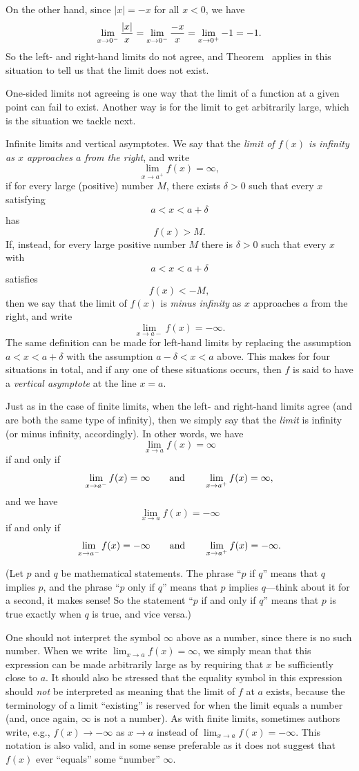 On the other hand, since $|x| = -x$ for all $x<0$, we have
$$\lim_{x\to 0^-} {|x|\over x} = \lim_{x\to 0^-} {-x\over x} = \lim_{x\to 0^+} -1 = -1.$$
So the left- and right-hand limits do not agree, and Theorem~{\thmonesideddiff} applies in
this situation to tell us that the limit does not exist.\slug

One-sided limits not agreeing is one way that the limit of a function at a given point can fail to exist.
Another way is for the limit to get arbitrarily large, which is the situation we tackle next.

\medskip\boldlabel {} Infinite limits and vertical asymptotes.
We say that the {\it limit of $f(x)$ is infinity as $x$ approaches $a$ from the right}, and write
$$\lim_{x\to a^+} f(x) = \infty,$$
if for every large (positive) number $M$, there exists $\delta > 0$ such that every $x$ satisfying
$$a < x < a+\delta$$
has
$$f(x) > M.$$
If, instead, for every large positive number $M$ there is $\delta > 0$ such that every $x$ with
$$a < x < a+\delta$$
satisfies
$$f(x) < -M,$$
then we say that the limit of $f(x)$ is {\it minus infinity} as $x$ approaches $a$ from the right,
and write
$$\lim_{x\to a-} f(x) = -\infty.$$
The same definition can be made for left-hand limits by replacing the assumption $a<x<a+\delta$
with the assumption $a-\delta<x<a$ above.
This makes for four situations in total, and if any one of these situations occurs, then $f$ is
said to have a {\it vertical asymptote} at the line $x=a$.

Just as in the case of finite limits, when the left- and right-hand limits agree (and are both
the same type of infinity), then we simply say that the {\it limit} is infinity
(or minus infinity, accordingly). In other words,
we have
$$\lim_{x\to a} f(x) = \infty$$
if and only if
$$\lim_{x\to a^-} f(x) = \infty\qquad\hbox{and}\qquad \lim_{x\to a^+} f(x) = \infty,$$
and we have
$$\lim_{x\to a} f(x) = -\infty$$
if and only if
$$\lim_{x\to a^-} f(x) = -\infty\qquad\hbox{and}\qquad \lim_{x\to a^+} f(x) = -\infty.$$

(Let $p$ and $q$ be mathematical statements. The phrase ``$p$ if $q$'' means that $q$ implies $p$,
and the phrase ``$p$ only if $q$'' means that $p$ implies $q$---think about it for a second, it makes sense!
So the statement ``$p$ if and only if $q$'' means that $p$ is true exactly when $q$ is true, and vice versa.)

One should not interpret the symbol $\infty$ above as a number, since there is no such number.
When we write $\lim_{x\to a} f(x) = \infty$,
we simply mean that this expression can be made arbitrarily large as by requiring that $x$ be sufficiently
close to $a$. It should also be stressed that the equality symbol in this expression should {\it not}
be interpreted
as meaning that the limit of $f$ at $a$ exists, because the terminology of a limit ``existing'' is reserved
for when the limit equals a number (and, once again, $\infty$ is not a number). As with finite limits,
sometimes authors write, e.g., $f(x)\to -\infty$ as $x\to a$ instead of $\lim_{x\to a} f(x) = -\infty$.
This notation is also valid, and in some sense preferable as it does not suggest that $f(x)$ ever ``equals''
some ``number'' $\infty$.

